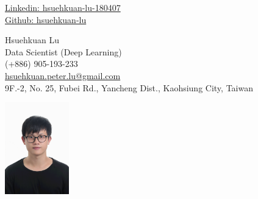 \begin{center}
	\begin{minipage}[b]{0.24\textwidth}
		{\href{https://www.linkedin.com/in/hsuehkuan-lu-180407/}{Linkedin: hsuehkuan-lu-180407} } \\
		\href{https://github.com/hsuehkuan-lu}{Github: hsuehkuan-lu}
		
	\end{minipage}%
	\begin{minipage}[b]{0.5\textwidth}
		\centering
		{\HUGE Hsuehkuan Lu} \\ %
		\vspace{0.1cm}
		{\color{UI_blue} \Large{Data Scientist (Deep Learning)}} \\
		\large (+886) 905-193-233 \\
		\large \href{mailto:hsuehkuan.peter.lu@gmail.com}{hsuehkuan.peter.lu@gmail.com} \\
		\small 9F.-2, No. 25, Fubei Rd., Yancheng Dist., Kaohsiung City, Taiwan \\
	\end{minipage}%
	\begin{minipage}[b]{0.24\textwidth}
		\flushright \large  %
		\includegraphics[width=2.8cm, height=4cm]{images/me.jpg}
	\end{minipage}   
	
\end{center}